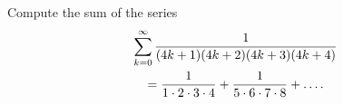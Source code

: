 \documentclass{article}
\begin{document}
\setlength{\parindent}{0pt}
Compute the sum of the series
\begin{multline*}
\sum_{k=0}^{\infty}\frac{1}{(4k+1)(4k+2)(4k+3)(4k+4)}\\=\frac{1}{1\cdot 2\cdot 3\cdot 4}+\frac{1}{5\cdot 6\cdot 7\cdot 8}+\dots.$$
\end{multline*}
\end{document}
